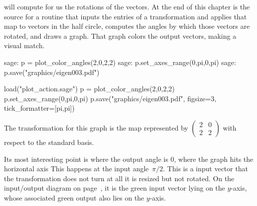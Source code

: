 \Sage{} will compute for us the rotations of the vectors.
At the end of this chapter is the source for a routine 
 that
inputs the entries of a transformation and applies that map
to vectors in the half circle, 
computes the angles by which those
vectors are rotated, and draws a graph. 
That graph colors the output vectors,
making a visual match.
\begin{sagecommandline}
sage: p = plot_color_angles(2,0,2,2)
sage: p.set_axes_range(0,pi,0,pi)
sage: p.save("graphics/eigen003.pdf")
\end{sagecommandline}
\begin{sagesilent}
load("plot_action.sage")  
p = plot_color_angles(2,0,2,2)
p.set_axes_range(0,pi,0,pi)
p.save("graphics/eigen003.pdf", figsize=3, tick_formatter=[pi,pi])
\end{sagesilent}
The transformation for this graph is the map represented by
$\left(\begin{smallmatrix}  2 &0 \\ 2 &2\end{smallmatrix}\right)$
with respect to the standard basis.
\begin{center}
\end{center}
Its most interesting point is where the output angle is $0$,
where the graph hits the horizontal axis
This happens at the input angle~$\pi/2$.
This is a input vector that the transformation does not turn at all\Dash 
it is resized but not rotated.
On the input/output diagram on page~\pageref{gr:firstgraphic}, it is
the green input vector lying on the $y$-axis, whose
associated green output also lies on the $y$-axis.




